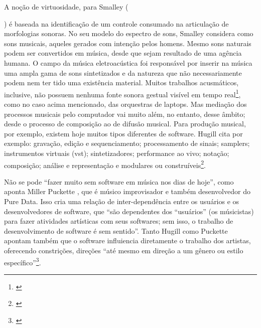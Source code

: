 A noção de virtuosidade, para Smalley ({\citeyear{Smalley1996}) é baseada na identificação de um controle consumado na articulação de morfologias sonoras. No seu modelo do espectro de sons, Smalley considera como sons musicais, aqueles gerados com intenção pelos homens. Mesmo sons naturais podem ser convertidos em música, desde que sejam resultado de uma agência humana. O campo da música eletroacústica foi responsável por inserir na música uma ampla gama de sons sintetizados e da natureza que não necessariamente podem nem ter tido uma existência material. Muitos trabalhos acusmáticos, inclusive, não possuem nenhuma fonte sonora gestual visível em tempo real\footnote{\cite[95, 101]{Smalley1996}}, como no caso acima mencionado, das orquestras de laptops. Mas mediação dos processos musicais pelo computador vai muito além, no entanto, desse âmbito; desde o processo de composição ao de difusão musical. Para produção musical, por exemplo, existem hoje muitos tipos diferentes de software. Hugill \citeyear{Hugill2012} cita por exemplo: gravação, edição e sequenciamento; processamento de sinais; samplers; instrumentos virtuais (vst); sintetizadores; performance ao vivo; notação; composição; análise e representação e modulares ou construíveis\footnote{\cite[195]{Hugill2012}}.


Não se pode ``fazer muito sem software em música nos dias de hoje'', como aponta Miller Puckette \citeyear{PucketteMiller}, que é músico improvisador e também desenvolvedor do Pure Data. Isso cria uma relação de inter-dependência entre os usuários e os desenvolvedores de software, que ``são dependentes dos ``usuários'' (os músicistas) para fazer atividades artísticas com seus softwares; sem isso, o trabalho de desenvolvimento de software é sem sentido''. Tanto Hugill \citeyear{Hugill2012} como Puckette \citeyear{PucketteMiller} apontam também que o software influiencia diretamente o trabalho dos artistas, oferecendo constrições, direções ``até mesmo em direção a um gênero ou estilo específico''\footnote{\cite[195]{Hugill2012}}. 

}
